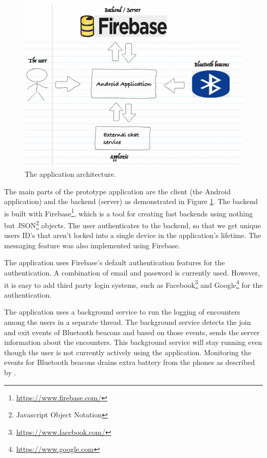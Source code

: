 
\begin{figure}[htb]
	\begin{center}
		\includegraphics[width=1\textwidth]{fs_architecture.png}
		\caption{The application architecture.}
		\label{fig:fs_architecture}
	\end{center}
\end{figure}

The main parts of the prototype application are the client (the Android application) and the backend (server) as demonstrated in Figure \ref{fig:fs_architecture}. The backend is built with Firebase\footnote{\url{https://www.firebase.com/}}, which is a tool for creating fast backends using nothing but JSON\footnote{Javascript Object Notation} objects. The user authenticates to the backend, so that we get unique users ID's that aren't locked into a single device in the application's lifetime. The messaging feature was also implemented using Firebase.

The application uses Firebase's default authentication features for the authentication. A combination of email and password is currently used. However, it is easy to add third party login systems, such as Facebook\footnote{\url{https://www.facebook.com/}} and Google\footnote{\url{https://www.google.com}} for the authentication.

The application uses a background service to run the logging of encounters among the users in a separate thread. The background service detects the join and exit events of Bluetooth beacons and based on those events, sends the server information about the encounters. This background service will stay running even though the user is not currently actively using the application. Monitoring the events for Bluetooth beacons drains extra battery from the phones as described by \citep{bluetoothOverview}.

